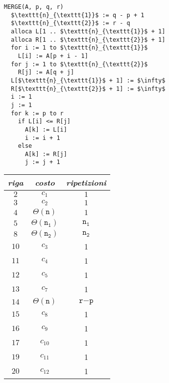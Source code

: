 \documentclass[italian, 10pt]{article}
\begin{document}
\begin{minipage}[t]{0.495\textwidth}
  \begin{lstlisting}[style=pseudocode, caption={Pseudocodice dell'algoritmo \texttt{MERGE}}, label={lst:pseudocodice-merge}]
MERGE(A, p, q, r)
  $\texttt{n}_{\texttt{1}}$ := q - p + 1
  $\texttt{n}_{\texttt{2}}$ := r - q
  alloca L[1 .. $\texttt{n}_{\texttt{1}}$ + 1]
  alloca R[1 .. $\texttt{n}_{\texttt{2}}$ + 1]
  for i := 1 to $\texttt{n}_{\texttt{1}}$
    L[i] := A[p + i - 1]
  for j := 1 to $\texttt{n}_{\texttt{2}}$
    R[j] := A[q + j]
  L[$\texttt{n}_{\texttt{1}}$ + 1] := $\infty$
  R[$\texttt{n}_{\texttt{2}}$ + 1] := $\infty$
  i := 1
  j := 1
  for k := p to r
    if L[i] <= R[j]
      A[k] := L[i]
      i := i + 1
    else
      A[k] := R[j]
      j := j + 1
  \end{lstlisting}
\end{minipage}
\begin{minipage}[t]{0.495\textwidth}
  \centering
  \begin{tabular}[t]{ccc}
    \textit{riga} & \textit{costo}                      & \textit{ripetizioni}        \\ \hline
    \(2\)         & \(c_1\)                             & \(1\)                       \\
    \(3\)         & \(c_2\)                             & \(1\)                       \\
    \(4\)         & \(\Theta(\texttt{n})\)              & \(1\)                       \\
    \(5\)         & \(\Theta(\texttt{n}_{\texttt{1}})\) & \(\texttt{n}_{\texttt{1}}\) \\
    \(8\)         & \(\Theta(\texttt{n}_{\texttt{2}})\) & \(\texttt{n}_{\texttt{2}}\) \\
    \(10\)        & \(c_3\)                             & 1                           \\
    \(11\)        & \(c_4\)                             & 1                           \\
    \(12\)        & \(c_5\)                             & 1                           \\
    \(13\)        & \(c_7\)                             & 1                           \\
    \(14\)        & \(\Theta(\texttt{n})\)              & \(\texttt{r} - \texttt{p}\) \\
    \(15\)        & \(c_8\)                             & 1                           \\
    \(16\)        & \(c_9\)                             & 1                           \\
    \(17\)        & \(c_{10}\)                          & 1                           \\
    \(19\)        & \(c_{11}\)                          & 1                           \\
    \(20\)        & \(c_{12}\)                          & 1                           \\
  \end{tabular}
\end{minipage}
\end{document}
